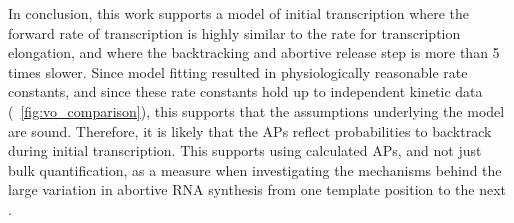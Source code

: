 In conclusion, this work supports a model of initial transcription where the
forward rate of transcription is highly similar to the rate for transcription
elongation, and where the backtracking and abortive release step is more than
5 times slower. Since model fitting resulted in physiologically reasonable
rate constants, and since these rate constants hold up to independent kinetic
data (\FIG~\ref{fig:vo_comparison}), this supports that the assumptions
underlying the model are sound. Therefore, it is likely that the APs reflect
probabilities to backtrack during initial transcription. This supports using
calculated APs, and not just bulk quantification, as a measure when
investigating the mechanisms behind the large variation in abortive RNA
synthesis from one template position to the next \cite{hsu_initial_2006}.
